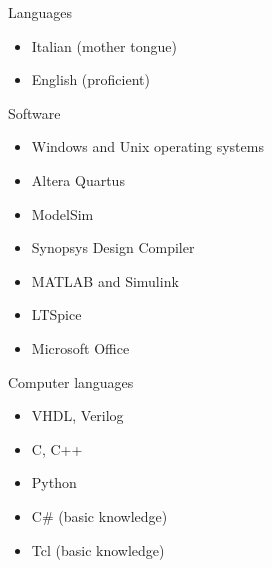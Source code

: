 \begin{cvskills}
  \cvskill
    {Languages}
    {
      \begin{itemize}
      \item [] Italian (mother tongue)
      \item [] English (proficient)
      \end{itemize}
    }
    
    \cvskill
    {Software}
    {
      \begin{itemize}
      \item [] Windows and Unix operating systems
      \item [] Altera Quartus
      \item [] ModelSim
      \item [] Synopsys Design Compiler
      \item [] MATLAB and Simulink
      \item [] LTSpice 
      \item [] Microsoft Office     
      \end{itemize}
    }
    
    \cvskill
    {Computer languages}
    {
      \begin{itemize}
	    \item [] VHDL, Verilog     
      \item [] C, C++
      \item [] Python
      \item [] C\# (basic knowledge)
      \item [] Tcl (basic knowledge)
      \end{itemize}
    }
\end{cvskills}
